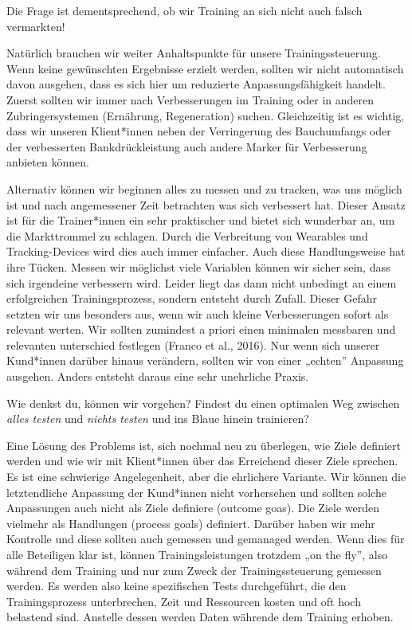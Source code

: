 \documentclass[
  letterpaper,
  DIV=11,
  numbers=noendperiod]{scrreprt}
\begin{document}
Die Frage ist dementsprechend, ob wir Training an sich nicht auch falsch
vermarkten!

Natürlich brauchen wir weiter Anhaltspunkte für unsere
Trainingssteuerung. Wenn keine gewünschten Ergebnisse erzielt werden,
sollten wir nicht automatisch davon ausgehen, dass es sich hier um
reduzierte Anpassungsfähigkeit handelt. Zuerst sollten wir immer nach
Verbesserungen im Training oder in anderen Zubringersystemen (Ernährung,
Regeneration) suchen. Gleichzeitig ist es wichtig, dass wir unseren
Klient*innen neben der Verringerung des Bauchumfangs oder der
verbesserten Bankdrückleistung auch andere Marker für Verbesserung
anbieten können.

Alternativ können wir beginnen alles zu messen und zu tracken, was uns
möglich ist und nach angemessener Zeit betrachten was sich verbessert
hat. Dieser Ansatz ist für die Trainer*innen ein sehr praktischer und
bietet sich wunderbar an, um die Markttrommel zu schlagen. Durch die
Verbreitung von Wearables und Tracking-Devices wird dies auch immer
einfacher. Auch diese Handlungsweise hat ihre Tücken. Messen wir
möglichst viele Variablen können wir sicher sein, dass sich irgendeine
verbessern wird. Leider liegt das dann nicht unbedingt an einem
erfolgreichen Trainingsprozess, sondern entsteht durch Zufall. Dieser
Gefahr setzten wir uns besonders aus, wenn wir auch kleine
Verbesserungen sofort als relevant werten. Wir sollten zumindest a
priori einen minimalen messbaren und relevanten unterschied festlegen
(Franco et al., 2016). Nur wenn sich unserer Kund*innen darüber hinaus
verändern, sollten wir von einer „echten'' Anpassung ausgehen. Anders
entsteht daraus eine sehr unehrliche Praxis.

Wie denkst du, können wir vorgehen? Findest du einen optimalen Weg
zwischen \emph{alles testen} und \emph{nichts testen} und ins Blaue
hinein trainieren?

Eine Lösung des Problems ist, sich nochmal neu zu überlegen, wie Ziele
definiert werden und wie wir mit Klient*innen über das Erreichend dieser
Ziele sprechen. Es ist eine schwierige Angelegenheit, aber die
ehrlichere Variante. Wir können die letztendliche Anpassung der
Kund*innen nicht vorhersehen und sollten solche Anpassungen auch nicht
als Ziele definiere (outcome goas). Die Ziele werden vielmehr als
Handlungen (process goals) definiert. Darüber haben wir mehr Kontrolle
und diese sollten auch gemessen und gemanaged werden. Wenn dies für alle
Beteiligen klar ist, können Trainingsleistungen trotzdem „on the fly'',
also während dem Training und nur zum Zweck der Trainingssteuerung
gemessen werden. Es werden also keine spezifischen Tests durchgeführt,
die den Trainingsprozess unterbrechen, Zeit und Ressourcen kosten und
oft hoch belastend sind. Anstelle dessen werden Daten währende dem
Training erhoben.
\end{document}
